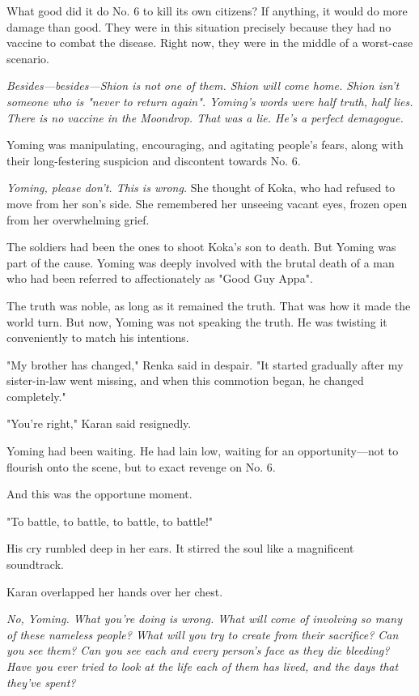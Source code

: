 What good did it do No. 6 to kill its own citizens? If anything, it
would do more damage than good. They were in this situation precisely
because they had no vaccine to combat the disease. Right now, they were
in the middle of a worst-case scenario.

\emph{Besides---besides---Shion is not one of them. Shion will come home. Shion
isn't someone who is "never to return again". Yoming's words were half
truth, half lies. There is no vaccine in the Moondrop. That was a lie.
He's a perfect demagogue.}

Yoming was manipulating, encouraging, and agitating people's fears,
along with their long-festering suspicion and discontent towards No. 6.

\emph{Yoming, please don't. This is wrong.} She thought of Koka, who had
refused to move from her son's side. She remembered her unseeing vacant
eyes, frozen open from her overwhelming grief.

The soldiers had been the ones to shoot Koka's son to death. But Yoming
was part of the cause. Yoming was deeply involved with the brutal death
of a man who had been referred to affectionately as "Good Guy Appa".

The truth was noble, as long as it remained the truth. That was how it
made the world turn. But now, Yoming was not speaking the truth. He was
twisting it conveniently to match his intentions.

"My brother has changed," Renka said in despair. "It started gradually
after my sister-in-law went missing, and when this commotion began, he
changed completely."

"You're right," Karan said resignedly.

Yoming had been waiting. He had lain low, waiting for an opportunity---not
to flourish onto the scene, but to exact revenge on No. 6.

And this was the opportune moment.

"To battle, to battle, to battle, to battle!"

His cry rumbled deep in her ears. It stirred the soul like a magnificent
soundtrack.

Karan overlapped her hands over her chest.

\emph{No, Yoming. What you're doing is wrong. What will come of involving so
many of these nameless people? What will you try to create from their
sacrifice? Can you see them? Can you see each and every person's face as
they die bleeding? Have you ever tried to look at the life each of them
has lived, and the days that they've spent?}

